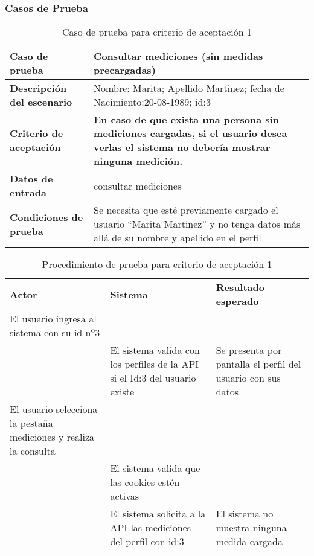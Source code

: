 \clearpage
\subsubsection{Casos de Prueba}


	\begin{table}
	\centering
	\begin{tabular}{|m{4cm}|m{9cm}|}
    	\rowcolor[gray]{0.9}
        \hline 
	    \textbf{Caso de prueba} & \textbf{Consultar mediciones (sin medidas precargadas)}\\  \hline
	    \textbf{Descripción del escenario}& Nombre: Marita; Apellido Martinez; fecha de Nacimiento:20-08-1989; id:3  \\ \hline
	    \textbf{Criterio de aceptación}&  \textbf{En caso de que exista una persona sin mediciones cargadas, si el usuario desea verlas el sistema no debería mostrar ninguna medición.} \\ \hline
        \textbf{Datos de entrada}&  consultar mediciones\\ \hline
        \textbf{Condiciones de  prueba}& Se necesita que esté previamente cargado el usuario ``Marita Martinez'' y no tenga datos más allá de su nombre y apellido en el perfil \\ \hline
	    \end{tabular}
        \caption{Caso de prueba para criterio de aceptación 1}
    	\end{table}
  
{\scriptsize
	\begin{table}[h]
    \centering
	\begin{longtable}{|p{5cm}|p{5cm}|p{5cm}|}
	    \hline \hline \rowcolor[gray]{0.9}
        \multicolumn{3}{|c|}{\textbf{Procedimiento de Prueba - ``Consultar mediciones''}} \\
        \hline \rowcolor[gray]{0.9}
		    \textbf{Actor} & 
	        \textbf{Sistema}& 
        	\textbf{Resultado esperado} \\  
        \hline
	    El usuario ingresa al sistema con su id nº3	& &\\ \hline
        		& El sistema valida con los perfiles de la API si el Id:3 del usuario existe& Se presenta por pantalla el perfil del usuario con sus datos  \\ \hline        
	    El usuario selecciona la pestaña mediciones y realiza la consulta& &\\ \hline
      	&El sistema valida que las cookies estén activas&\\ \hline
   		&El sistema solicita a la API las mediciones del perfil con id:3&El sistema no muestra ninguna medida cargada \\ \hline 
	    \end{longtable}
		\caption{Procedimiento de prueba para criterio de aceptación 1}
    	\end{table}
	}
    
